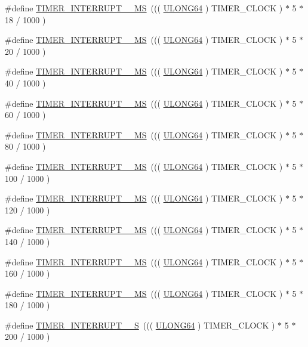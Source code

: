 \begin{DoxyCompactItemize}
\#define \hyperlink{a00673_ga2cd73fada37ee4d173af1cb7dda9eca8}{TIMER\_\-INTERRUPT\_\_\-MS}~((( \hyperlink{a00660_ga28961430434ccabca6862ea93fe9a15b}{ULONG64} ) TIMER\_\-CLOCK ) $\ast$ 5 $\ast$ 18 / 1000 )
\item 
\#define \hyperlink{a00673_gad5a78b2ffba4f82dde6607a5cf7af659}{TIMER\_\-INTERRUPT\_\_\-MS}~((( \hyperlink{a00660_ga28961430434ccabca6862ea93fe9a15b}{ULONG64} ) TIMER\_\-CLOCK ) $\ast$ 5 $\ast$ 20 / 1000 )
\item 
\#define \hyperlink{a00673_ga59d6708c9cba03cf6fd9cf6c72529ab6}{TIMER\_\-INTERRUPT\_\_\-MS}~((( \hyperlink{a00660_ga28961430434ccabca6862ea93fe9a15b}{ULONG64} ) TIMER\_\-CLOCK ) $\ast$ 5 $\ast$ 40 / 1000 )
\item 
\#define \hyperlink{a00673_gaa4940d6bdf476029bda023939a17b096}{TIMER\_\-INTERRUPT\_\_\-MS}~((( \hyperlink{a00660_ga28961430434ccabca6862ea93fe9a15b}{ULONG64} ) TIMER\_\-CLOCK ) $\ast$ 5 $\ast$ 60 / 1000 )
\item 
\#define \hyperlink{a00673_ga876a37d4588162417327081c31249a09}{TIMER\_\-INTERRUPT\_\_\-MS}~((( \hyperlink{a00660_ga28961430434ccabca6862ea93fe9a15b}{ULONG64} ) TIMER\_\-CLOCK ) $\ast$ 5 $\ast$ 80 / 1000 )
\item 
\#define \hyperlink{a00673_gaa2d9363dd86d3618f88763c9a220b7a6}{TIMER\_\-INTERRUPT\_\_\-MS}~((( \hyperlink{a00660_ga28961430434ccabca6862ea93fe9a15b}{ULONG64} ) TIMER\_\-CLOCK ) $\ast$ 5 $\ast$ 100 / 1000 )
\item 
\#define \hyperlink{a00673_ga8911ab7a7dcc03f488617e3f11cd5d5b}{TIMER\_\-INTERRUPT\_\_\-MS}~((( \hyperlink{a00660_ga28961430434ccabca6862ea93fe9a15b}{ULONG64} ) TIMER\_\-CLOCK ) $\ast$ 5 $\ast$ 120 / 1000 )
\item 
\#define \hyperlink{a00673_ga444096811394aa490ec470aa1894e703}{TIMER\_\-INTERRUPT\_\_\-MS}~((( \hyperlink{a00660_ga28961430434ccabca6862ea93fe9a15b}{ULONG64} ) TIMER\_\-CLOCK ) $\ast$ 5 $\ast$ 140 / 1000 )
\item 
\#define \hyperlink{a00673_ga1d84a0363d80e46ecec3bf811837242b}{TIMER\_\-INTERRUPT\_\_\-MS}~((( \hyperlink{a00660_ga28961430434ccabca6862ea93fe9a15b}{ULONG64} ) TIMER\_\-CLOCK ) $\ast$ 5 $\ast$ 160 / 1000 )
\item 
\#define \hyperlink{a00673_gadb278155a97d15ad4ac348c292c9b60f}{TIMER\_\-INTERRUPT\_\_\-MS}~((( \hyperlink{a00660_ga28961430434ccabca6862ea93fe9a15b}{ULONG64} ) TIMER\_\-CLOCK ) $\ast$ 5 $\ast$ 180 / 1000 )
\item 
\#define \hyperlink{a00673_ga1bf445c2d853b42c6c8f7d704f0c99ce}{TIMER\_\-INTERRUPT\_\_\-S}~((( \hyperlink{a00660_ga28961430434ccabca6862ea93fe9a15b}{ULONG64} ) TIMER\_\-CLOCK ) $\ast$ 5 $\ast$ 200 / 1000 )

\end{DoxyCompactItemize}
